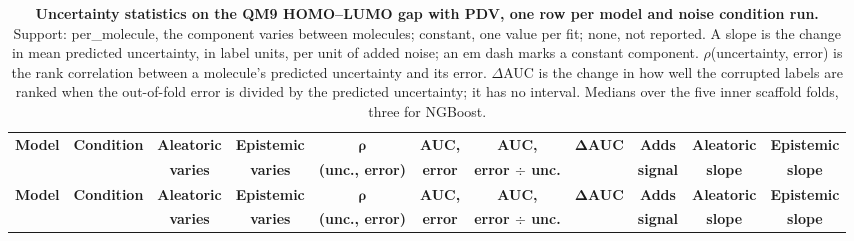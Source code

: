 
{\scriptsize
\setlength{\tabcolsep}{3pt}
\begin{longtable}{lcccccccccc}
\caption{\textbf{\SuppFile{} Uncertainty statistics on the QM9 HOMO--LUMO gap with PDV, one row per model and noise condition run.}
Support: per\_molecule, the component varies between molecules; constant, one value per fit; none, not reported. A slope is the change in mean predicted uncertainty, in label units, per unit of added noise; an em dash marks a constant component. $\rho$(uncertainty, error) is the rank correlation between a molecule's predicted uncertainty and its error. $\Delta$AUC is the change in how well the corrupted labels are ranked when the out-of-fold error is divided by the predicted uncertainty; it has no interval. Medians over the five inner scaffold folds, three for NGBoost.}
\label{supp:uncertainty_statistics_qm9_pdv}\\
\toprule
\textbf{Model} & \textbf{Condition} & \textbf{Aleatoric} & \textbf{Epistemic} & $\boldsymbol{\rho}$ & \textbf{AUC,} & \textbf{AUC,} & $\boldsymbol{\Delta}$\textbf{AUC} & \textbf{Adds} & \textbf{Aleatoric} & \textbf{Epistemic} \\
 & & \textbf{varies} & \textbf{varies} & \textbf{(unc., error)} & \textbf{error} & \textbf{error $\div$ unc.} & & \textbf{signal} & \textbf{slope} & \textbf{slope} \\
\midrule
\endfirsthead
\toprule
\textbf{Model} & \textbf{Condition} & \textbf{Aleatoric} & \textbf{Epistemic} & $\boldsymbol{\rho}$ & \textbf{AUC,} & \textbf{AUC,} & $\boldsymbol{\Delta}$\textbf{AUC} & \textbf{Adds} & \textbf{Aleatoric} & \textbf{Epistemic} \\
 & & \textbf{varies} & \textbf{varies} & \textbf{(unc., error)} & \textbf{error} & \textbf{error $\div$ unc.} & & \textbf{signal} & \textbf{slope} & \textbf{slope} \\
\midrule
\endhead

\bottomrule
\end{longtable}}

